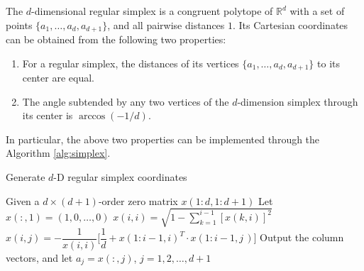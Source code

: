 \documentclass[mathpazo]{csam}
\theoremstyle{remark}
\begin{document}
The $d$-dimensional regular simplex is a congruent polytope of
$\mathbb{R}^d$ with a set of points $\{a_1,\dots,a_d,a_{d+1}\}$,
and all pairwise distances $1$.
Its Cartesian coordinates can be obtained from the following two properties:
\begin{enumerate}
	\item For a regular simplex, the distances of its vertices 
		$\{a_1,\dots,a_d,a_{d+1}\}$ to its center are equal.
	\item The angle subtended by any two vertices of the 
		$d$-dimension simplex through its center is
		$\arccos(-1/d)$.
\end{enumerate}
In particular, the above two properties can be implemented
through the Algorithm \ref{alg:simplex}.
\begin{algorithm}[!htpb]
	\caption{Generate $d$-D regular simplex coordinates} 
	\label{alg:simplex}
\begin{algorithmic}
	\STATE Given a $d\times(d+1)$-order zero matrix $x(1:d,1:d+1)$
	\STATE Let $x(:,1) = (1,0,\dots,0)$
	\STATE $x(i,i)=\sqrt{1-\sum_{k=1}^{i-1} [x(k, i)]^{2}}$
		\STATE $x(i,j)
		=-\dfrac{1}{x(i,i)}\Big[\dfrac{1}{d}+x(1:i-1, i)^T \cdot
		x(1:i-1, j\,)\Big]$
		\ENDFOR
	\ENDFOR
	\STATE Output the column vectors, and let $a_j=x(:,j)$,
	$j=1,2,\dots,d+1$ 
\end{algorithmic}
\end{algorithm}
\end{document}
